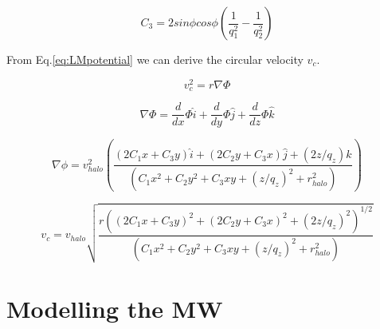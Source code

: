 \documentclass[a4paper, 12pt]{article} %
\begin{document}
\begin{equation}
C_3 = 2 sin \phi cos\phi \left( \dfrac{1}{q_1^2} - \dfrac{1}{q_2^2} \right)
\end{equation}

From Eq.\ref{eq:LMpotential} we can derive the circular velocity $v_c$. 

\begin{equation}
v_c^2 = r \nabla  \Phi 
\end{equation}

\begin{equation}
\nabla \Phi = \dfrac{d}{dx} \Phi \hat{i} + \dfrac{d}{dy} \Phi \hat{j} + \dfrac{d}{dz} \Phi \hat{k}
\end{equation}

\begin{equation}
\nabla \phi = v_{halo}^2  \left( \dfrac{(2C_1x + C_3 y)\hat{i} + (2C_2y + C_3x)\hat{j} + (2z/q_z)\hat{k}}{(C_1 x^2 + C_2 y^2 + C_3 x y + (z/q_z)^2 + r_{halo}^2)}    \right)
\end{equation}

\begin{equation}
v_c = v_{halo} \sqrt{ \dfrac{r((2C_1x + C_3 y)^2 + (2C_2y + C_3x)^2 + (2z/q_z)^2)^{1/2}}{(C_1 x^2 + C_2 y^2 + C_3 x y + (z/q_z)^2 + r_{halo}^2)} }
\end{equation}

\section{Modelling the MW}
\end{document}

